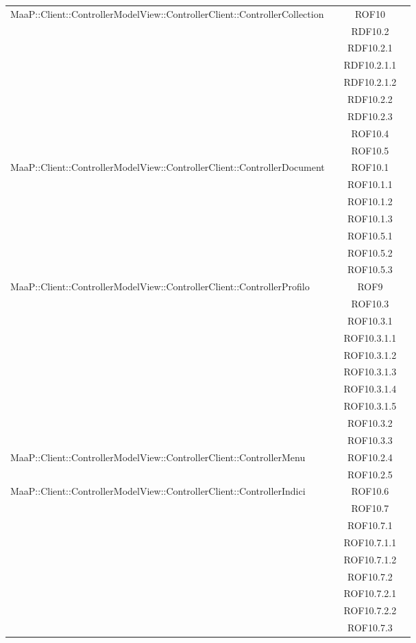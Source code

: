 \begin{center}
\begin{longtable}{|p{0.8\linewidth}|c|}
\midrule 
MaaP::Client::ControllerModelView::ControllerClient::ControllerCollection
& ROF10\\
& RDF10.2\\
& RDF10.2.1\\
& RDF10.2.1.1\\
& RDF10.2.1.2\\
& RDF10.2.2\\
& RDF10.2.3\\
& ROF10.4\\
& ROF10.5\\


\midrule 
MaaP::Client::ControllerModelView::ControllerClient::ControllerDocument
& ROF10.1\\
& ROF10.1.1\\
& ROF10.1.2\\
& ROF10.1.3\\
& ROF10.5.1\\
& ROF10.5.2\\
& ROF10.5.3\\


\midrule 
MaaP::Client::ControllerModelView::ControllerClient::ControllerProfilo
& ROF9\\
& ROF10.3\\
& ROF10.3.1\\
& ROF10.3.1.1\\
& ROF10.3.1.2\\
& ROF10.3.1.3\\
& ROF10.3.1.4\\
& ROF10.3.1.5\\
& ROF10.3.2\\
& ROF10.3.3\\


\midrule 
MaaP::Client::ControllerModelView::ControllerClient::ControllerMenu
& ROF10.2.4\\
& ROF10.2.5\\

\midrule 
MaaP::Client::ControllerModelView::ControllerClient::ControllerIndici
& ROF10.6\\
& ROF10.7\\
& ROF10.7.1\\
& ROF10.7.1.1\\
& ROF10.7.1.2\\
& ROF10.7.2\\
& ROF10.7.2.1\\
& ROF10.7.2.2\\
& ROF10.7.3\\



\end{longtable}
\end{center}
